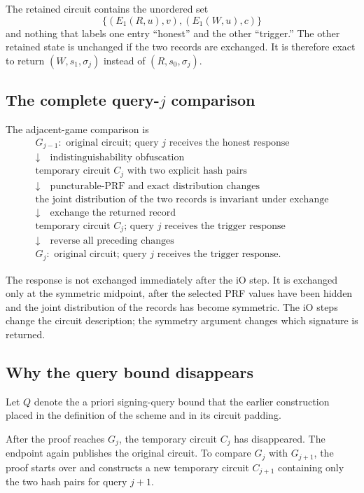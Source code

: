 \documentclass[11pt]{article}
\begin{document}
The retained circuit contains the unordered set
\[
  \{(E_1(R,u),v),(E_1(W,u),c)\}
\]
and nothing that labels one entry ``honest'' and the other ``trigger.''  The
other retained state is unchanged if the two records are exchanged.  It is
therefore exact to return \((W,s_1,\sigma_j)\) instead of
\((R,s_0,\sigma_j)\).

\subsection{The complete query-\texorpdfstring{\(j\)}{j} comparison}

The adjacent-game comparison is
\[
\begin{array}{c}
G_{j-1}:
\text{ original circuit; query \(j\) receives the honest response}\\
\downarrow\quad \text{indistinguishability obfuscation}\\
\text{temporary circuit \(C_j\) with two explicit hash pairs}\\
\downarrow\quad \text{puncturable-PRF and exact distribution changes}\\
\text{the joint distribution of the two records is invariant under exchange}\\
\downarrow\quad \text{exchange the returned record}\\
\text{temporary circuit \(C_j\); query \(j\) receives the trigger response}\\
\downarrow\quad \text{reverse all preceding changes}\\
G_j:
\text{ original circuit; query \(j\) receives the trigger response}.
\end{array}
\]

The response is not exchanged immediately after the iO step.  It is
exchanged only at the symmetric midpoint, after the selected PRF values have
been hidden and the joint distribution of the records has become symmetric.
The
iO steps change the circuit description; the symmetry argument changes
which signature is returned.

\subsection{Why the query bound disappears}

Let \(Q\) denote the a priori signing-query bound that the earlier
construction placed in the definition of the scheme and in its circuit
padding.

After the proof reaches \(G_j\), the temporary circuit \(C_j\) has
disappeared.  The endpoint again publishes the original circuit.  To compare
\(G_j\) with \(G_{j+1}\), the proof starts over and constructs a new
temporary circuit \(C_{j+1}\) containing only the two hash pairs for query
\(j+1\).
\end{document}
